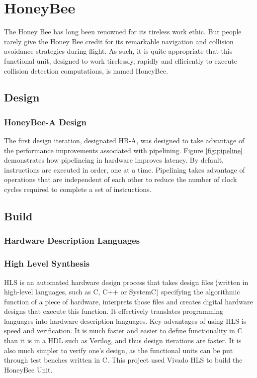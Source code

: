 \newpage
\section{HoneyBee}
    The Honey Bee has long been renowned for its tireless work ethic. But people rarely give the Honey Bee credit for its remarkable navigation and collision avoidance strategies during flight. As such, it is quite appropriate that this functional unit, designed to work tirelessly, rapidly and efficiently to execute collision detection computations, is named HoneyBee. \\


    \subsection{Design}
        \subsubsection*{HoneyBee-A Design}
        The first design iteration, designated \gls{HB-A}, was designed to take advantage of the performance improvements associated with pipelining. Figure \ref{fig:pipeline} demonstrates how pipelineing in hardware improves latency. By default, instructions are executed in order, one at a time. Pipelining takes advantage of operations that are independent of each other to reduce the number of clock cycles required to complete a set of instructions. 
        
 

    \subsection{Build}
        \subsubsection*{Hardware Description Languages}

        \subsubsection*{High Level Synthesis}
        \gls{HLS} is an automated hardware design process that takes design files (written in high-level languages, such as C, C++ or SystemC) specifying the algorithmic function of a piece of hardware, interprets those files and creates digital hardware designs that execute this function. It effectively translates programming languages into hardware description languages. Key advantages of using HLS is speed and verification. It is much faster and easier to define functionality in C than it is in a \gls{HDL} such as Verilog, and thus design iterations are faster. It is also much simpler to verify one's design, as the functional units can be put through test benches written in C. This project used Vivado HLS to build the HoneyBee Unit.

